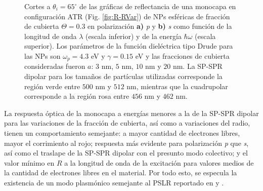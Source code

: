 \begin{figure}[h!]
	\caption{Cortes a $\theta_i = 65^\circ$ de las gráficas de reflectancia de una monocapa en configuración ATR (Fig. \ref{fig:R-RVar}) de NPs esféricas de fracción de cubierta $\Theta = 0.3$ en polarización \textbf{a)} \emph{p} y \textbf{b)} \emph{s} como función de la longitud de onda $\lambda$ (escala inferior) y de la energía $\hbar\omega$ (escala superior). Los parámetros de la función dieléctrica tipo Drude para las NPs son $\omega_p = 4.3$ eV y $\gamma = 0.15$ eV y las fracciones de cubierta consideradas fueron $a$: $3$ nm, $5$ nm, $10$ nm y $20$ nm. La SP-SPR dipolar para los tamaños de partículas utilizadas corresponde la región verde entre $500$ nm y $512$ nm, mientras que la cuadrupolar corresponde a la región rosa entre $456$ nm y $462$ nm.}\label{fig:R-RVar-Cuts}
	\end{figure}	

La respuesta óptica de la monocapa a energías menores a la de la SP-SPR dipolar para las variaciones de la fracción de cubierta, así como a variaciones del radio, tienen un comportamiento semejante: a mayor cantidad de electrones libres, mayor el corrimiento al rojo; respuesta más evidente para polarización \emph{p} que \emph{s}, así como el traslape  de la SP-SPR dipolar con el presunto modo colectivo; y el valor mínimo en $R$ a la longitud de onda de la excitación para valores medios de la cantidad de electrones libres en el material. Por todo esto, se especula la existencia de un modo plasmónico semejante al PSLR reportado en  \cite{kabashin2009plasmonic} y \cite{danilov2018ultra}. 

